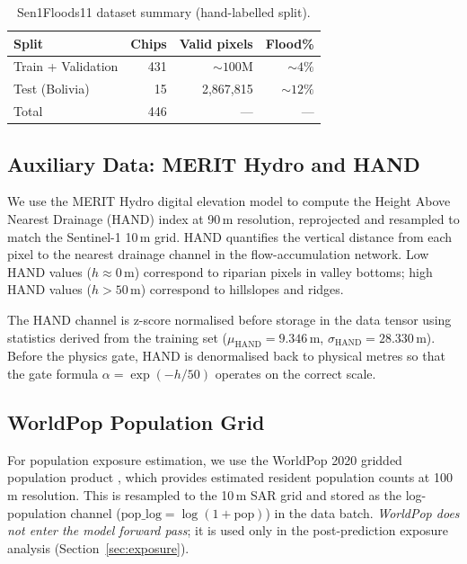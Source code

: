 \documentclass[12pt]{article}
\begin{document}
\begin{table}[h]
\centering
\caption{Sen1Floods11 dataset summary (hand-labelled split).}
\label{tab:dataset}
\begin{tabular}{lrrr}
\toprule
\textbf{Split} & \textbf{Chips} & \textbf{Valid pixels} & \textbf{Flood\%} \\
\midrule
Train + Validation & 431 & ${\sim}100\text{M}$ & ${\sim}4\%$ \\
Test (Bolivia) & 15 & 2{,}867{,}815 & ${\sim}12\%$ \\
\midrule
Total & 446 & — & — \\
\bottomrule
\end{tabular}
\end{table}

\subsection{Auxiliary Data: MERIT Hydro and HAND}

We use the MERIT Hydro digital elevation model \cite{yamazaki2019merit} to
compute the Height Above Nearest Drainage (HAND) index \cite{renno2008hand}
at 90\,m resolution, reprojected and resampled to match the Sentinel-1
10\,m grid.  HAND quantifies the vertical distance from each pixel to the
nearest drainage channel in the flow-accumulation network.  Low HAND values
($h \approx 0$\,m) correspond to riparian pixels in valley bottoms; high
HAND values ($h > 50$\,m) correspond to hillslopes and ridges.

The HAND channel is z-score normalised before storage in the data tensor using
statistics derived from the training set ($\mu_\text{HAND} = 9.346$\,m,
$\sigma_\text{HAND} = 28.330$\,m).  Before the physics gate, HAND is
denormalised back to physical metres so that the gate formula
$\alpha = \exp(-h/50)$ operates on the correct scale.

\subsection{WorldPop Population Grid}

For population exposure estimation, we use the WorldPop 2020 gridded
population product \cite{stevens2015disaggregating}, which provides estimated
resident population counts at 100\,m resolution.  This is resampled to the
10\,m SAR grid and stored as the log-population channel
($\text{pop\_log} = \log(1 + \text{pop})$) in the data batch.
\emph{WorldPop does not enter the model forward pass}; it is used only in
the post-prediction exposure analysis (Section~\ref{sec:exposure}).
\end{document}

